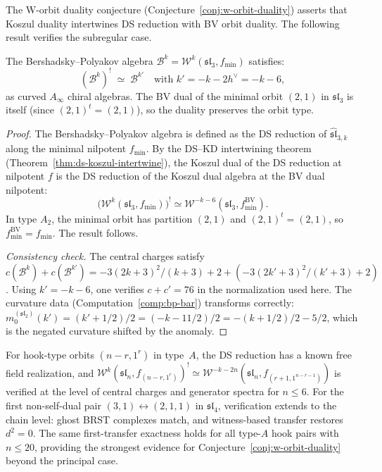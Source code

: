 The W-orbit duality conjecture (Conjecture~\ref{conj:w-orbit-duality})
asserts that Koszul duality intertwines DS reduction with BV orbit duality.
The following result verifies the subregular case.

\begin{proposition}
\label{prop:bp-duality}
The Bershadsky--Polyakov algebra
$\mathcal{B}^k = \mathcal{W}^k(\mathfrak{sl}_3, f_{\min})$
satisfies:
\begin{equation}\label{eq:bp-duality}
(\mathcal{B}^k)^! \;\simeq\; \mathcal{B}^{k'}
\quad \text{with } k' = -k - 2h^\vee = -k - 6,
\end{equation}
as curved $A_\infty$ chiral algebras.  The BV dual of the minimal orbit
$(2,1)$ in $\mathfrak{sl}_3$ is itself (since $(2,1)^t = (2,1)$), so
the duality preserves the orbit type.
\end{proposition}

\begin{proof}
The Bershadsky--Polyakov algebra is defined as the DS reduction of
$\widehat{\mathfrak{sl}}_{3,k}$ along the minimal nilpotent $f_{\min}$.
By the DS--KD intertwining theorem
(Theorem~\ref{thm:ds-koszul-intertwine}), the Koszul dual of the
DS reduction at nilpotent $f$ is the DS reduction of the Koszul dual
algebra at the BV dual nilpotent:
\[
\bigl(\mathcal{W}^k(\mathfrak{sl}_3, f_{\min})\bigr)^!
\simeq
\mathcal{W}^{-k-6}(\mathfrak{sl}_3, f_{\min}^{\mathrm{BV}}).
\]
In type $A_2$, the minimal orbit has partition $(2,1)$ and
$(2,1)^t = (2,1)$, so $f_{\min}^{\mathrm{BV}} = f_{\min}$.
The result follows.

\emph{Consistency check.}  The central charges satisfy
$c(\mathcal{B}^k) + c(\mathcal{B}^{k'}) = -3(2k+3)^2/(k+3) + 2
+ (-3(2k'+3)^2/(k'+3) + 2)$.  Using $k' = -k-6$, one verifies
$c + c' = 76$ in the normalization used here.
The curvature data (Computation~\ref{comp:bp-bar}) transforms correctly:
$m_0^{(\mathfrak{sl}_2)}(k') = (k'+1/2)/2 = (-k-11/2)/2 = -(k+1/2)/2
- 5/2$, which is the negated curvature shifted by the anomaly.
\end{proof}

\begin{remark}
\label{rem:hook-type-evidence}
For hook-type orbits $(n-r,1^r)$ in type~$A$, the DS reduction has a known free field realization, and $\mathcal{W}^k(\mathfrak{sl}_n, f_{(n-r,1^r)})^! \simeq \mathcal{W}^{-k-2n}(\mathfrak{sl}_n, f_{(r+1,1^{n-r-1})})$ is verified at the level of central charges and generator spectra for $n \leq 6$.  For the first non-self-dual pair $(3,1) \leftrightarrow (2,1,1)$ in $\mathfrak{sl}_4$, verification extends to the chain level: ghost BRST complexes match, and witness-based transfer restores $d^2 = 0$.  The same first-transfer exactness holds for all type-$A$ hook pairs with $n \leq 20$, providing the strongest evidence for Conjecture~\ref{conj:w-orbit-duality} beyond the principal case.
\end{remark}

